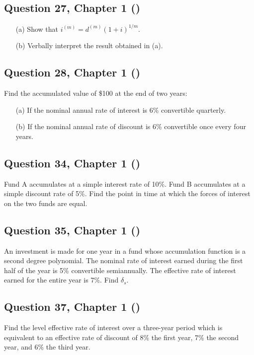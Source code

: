 \documentclass[12pt, a4paper]{article}
\begin{document}
\subsection*{Question 27, Chapter 1  (\cite{toi3rd})}
\noindent
\begin{enumerate}
    \item[(a)] Show that \( i^{(m)} = d^{(m)} (1 + i)^{1/m} \).
    \item[(b)] Verbally interpret the result obtained in (a).
\end{enumerate}

\subsection*{Question 28, Chapter 1  (\cite{toi3rd})}
\noindent Find the accumulated value of \$100 at the end of two years:
\begin{enumerate}
    \item[(a)] If the nominal annual rate of interest is 6\% convertible quarterly.
    \item[(b)] If the nominal annual rate of discount is 6\% convertible once every four years.
\end{enumerate}

\subsection*{Question 34, Chapter 1  (\cite{toi3rd})}
\noindent Fund A accumulates at a simple interest rate of 10\%. Fund B accumulates at a simple discount rate of 5\%. Find the point in time at which the forces of interest on the two funds are equal.

\subsection*{Question 35, Chapter 1  (\cite{toi3rd})}
\noindent An investment is made for one year in a fund whose accumulation function is a second degree polynomial. The nominal rate of interest earned during the first half of the year is 5\% convertible semiannually. The effective rate of interest earned for the entire year is 7\%. Find \( \delta_s \).

\subsection*{Question 37, Chapter 1  (\cite{toi3rd})}
\noindent Find the level effective rate of interest over a three-year period which is equivalent to an effective rate of discount of 8\% the first year, 7\% the second year, and 6\% the third year.
\end{document}
